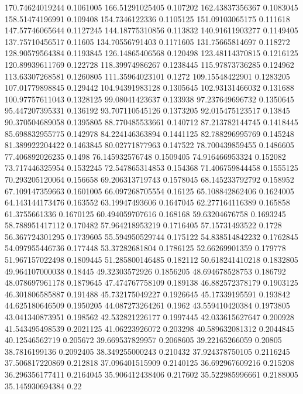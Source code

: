 170.74624019244 0.1061005
166.51291025405 0.107202
162.43837356367 0.1083045
158.51474196991 0.109408
154.7346122336 0.1105125
151.09103065175 0.111618
147.57746065644 0.1127245
144.18775310856 0.113832
140.91611903277 0.1149405
137.75710456517 0.11605
134.70556791403 0.1171605
131.75665814697 0.118272
128.90579564384 0.1193845
126.14865406568 0.120498
123.48114370815 0.1216125
120.89939611769 0.122728
118.39974986267 0.1238445
115.97873736285 0.124962
113.63307268581 0.1260805
111.35964023101 0.1272
109.15548422901 0.1283205
107.01779898845 0.129442
104.94391983128 0.1305645
102.93131466032 0.131688
100.97757611043 0.1328125
99.08041423637 0.133938
97.237649696732 0.1350645
95.447207395331 0.136192
93.707110545126 0.1373205
92.015475123517 0.13845
90.370504689058 0.1395805
88.770485533661 0.140712
87.213782144745 0.1418445
85.698832955775 0.142978
84.224146363894 0.1441125
82.788296995769 0.145248
81.389922204422 0.1463845
80.02771877963 0.147522
78.700439859455 0.1486605
77.406892026235 0.1498
76.145932576748 0.1509405
74.916466953324 0.152082
73.717446325954 0.1532245
72.547865314853 0.154368
71.406759844458 0.1555125
70.293205120064 0.156658
69.206313719743 0.1578045
68.145233792792 0.158952
67.109147359663 0.1601005
66.097268705554 0.16125
65.108842862406 0.1624005
64.143144173476 0.163552
63.19947493606 0.1647045
62.277164116389 0.165858
61.3755661336 0.1670125
60.494059707616 0.168168
59.63204676758 0.1693245
58.788951417112 0.170482
57.964218953219 0.1716405
57.15731493522 0.1728
56.367724301295 0.1739605
55.594950529744 0.175122
54.838514842232 0.1762845
54.097955446736 0.177448
53.37282681804 0.1786125
52.66269901359 0.179778
51.967157022498 0.1809445
51.285800146485 0.182112
50.618241410218 0.1832805
49.964107000038 0.18445
49.32303572926 0.1856205
48.694678528753 0.186792
48.078697961178 0.1879645
47.474767758109 0.189138
46.882572378179 0.1903125
46.301806585887 0.191488
45.732175049227 0.1926645
45.17339195591 0.193842
44.625180646509 0.1950205
44.087273264261 0.1962
43.559410420384 0.1973805
43.041340873951 0.198562
42.532821226177 0.1997445
42.033615627647 0.200928
41.543495498539 0.2021125
41.06223926072 0.203298
40.589632081312 0.2044845
40.12546562719 0.205672
39.669537829957 0.2068605
39.22165266059 0.20805
38.7816199136 0.2092405
38.349255000243 0.210432
37.924378750105 0.2116245
37.506817220869 0.212818
37.096401515909 0.2140125
36.692967609216 0.215208
36.296356177411 0.2164045
35.906412438406 0.217602
35.522985996661 0.2188005
35.145930694384 0.22

